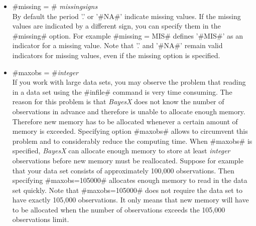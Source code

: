 
\begin{itemize}
\item #missing = # {\em missingsigns} \\
By default the period '.' or '#NA#' indicate missing values. If
the missing values are indicated by a different sign, you can
specify them in the #missing# option. For example #missing = MIS#
defines '#MIS#' as an indicator for a missing value. Note that
 '.' and '#NA#' remain valid indicators for missing values, even if the missing
option is specified.

\item #maxobs = #{\em integer} \\
If you work with large data sets, you may observe the problem that
reading in a data set using the #infile# command is very time
consuming. The reason for this problem is that {\em BayesX} does
not know the number of observations in advance and therefore is
unable to allocate enough memory. Therefore new memory has to be
allocated whenever a certain amount of memory is exceeded.
Specifying option #maxobs# allows to circumvent this problem and
to considerably reduce the computing time. When #maxobs# is
specified, {\em BayesX} can allocate enough memory to store at
least {\em integer} observations before new memory must be
reallocated. Suppose for example that your data set consists of
approximately 100,000 observations. Then specifying
#maxobs=105000# allocates enough memory to read in the data set
quickly. Note that #maxobs=105000# does not require the data set
to have exactly 105,000 observations. It only means that new
memory will have to be allocated when the number of observations
exceeds the 105,000 observations limit.
\end{itemize}



